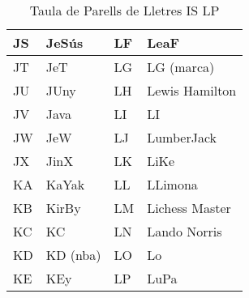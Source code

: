 \begin{table}[h]
\begin{tabular}{|l|l|l|l|}
    JS & JeSús                  & LF & LeaF           \\ \hline
    JT & JeT                    & LG & LG (marca)     \\ \hline
    JU & JUny                   & LH & Lewis Hamilton \\ \hline
    JV & Java                   & LI & LI             \\ \hline
    JW & JeW                    & LJ & LumberJack     \\ \hline
    JX & JinX                   & LK & LiKe           \\ \hline
    KA & KaYak                  & LL & LLimona        \\ \hline
    KB & KirBy                  & LM & Lichess Master \\ \hline
    KC & KC                     & LN & Lando Norris   \\ \hline
    KD & KD (nba)               & LO & Lo             \\ \hline
    KE & KEy                    & LP & LuPa           \\ \hline
    \end{tabular}
    \caption{Taula de Parells de Lletres IS \rightarrow LP}
    \label{tla:lletres-4}
    \end{table}


